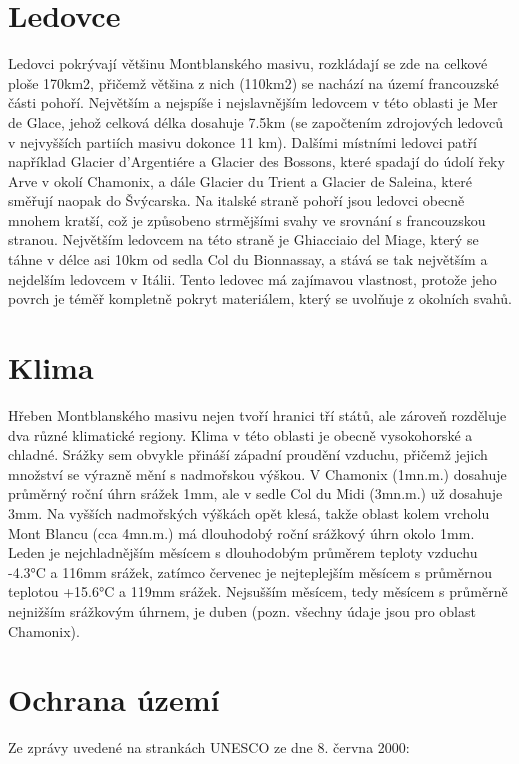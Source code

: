 \section{Ledovce}
Ledovci pokrývají většinu Montblanského masivu, rozkládají se zde na celkové ploše 170\:km2, přičemž většina z nich (110\:km2) se nachází na území francouzské části pohoří. Největším a nejspíše i nejslavnějším ledovcem v této oblasti je Mer de Glace, jehož celková délka dosahuje 7.5\:km (se započtením zdrojových ledovců v nejvyšších partiích masivu dokonce 11 km). Dalšími místními ledovci patří například Glacier d'Argentiére a Glacier des Bossons, které spadají do údolí řeky Arve v okolí Chamonix, a dále Glacier du Trient a Glacier de Saleina, které směřují naopak do Švýcarska. Na italské straně pohoří jsou ledovci obecně mnohem kratší, což je způsobeno strmějšími svahy ve srovnání s francouzskou stranou. Největším ledovcem na této straně je Ghiacciaio del Miage, který se táhne v délce asi 10\:km od sedla Col du Bionnassay, a stává se tak největším a nejdelším ledovcem v Itálii. Tento ledovec má zajímavou vlastnost, protože jeho povrch je téměř kompletně pokryt materiálem, který se uvolňuje z okolních svahů.

\section{Klima}
Hřeben Montblanského masivu nejen tvoří hranici tří států, ale zároveň rozděluje dva různé klimatické regiony. Klima v této oblasti je obecně vysokohorské a chladné. Srážky sem obvykle přináší západní proudění vzduchu, přičemž jejich množství se výrazně mění s nadmořskou výškou. V Chamonix (1\:m\:n.\:m.) dosahuje průměrný roční úhrn srážek 1\:mm, ale v sedle Col du Midi (3\:m\:n.\:m.) už dosahuje 3\:mm. Na vyšších nadmořských výškách opět klesá, takže oblast kolem vrcholu Mont Blancu (cca 4\:m\:n.\:m.) má dlouhodobý roční srážkový úhrn okolo 1\:mm. Leden je nejchladnějším měsícem s dlouhodobým průměrem teploty vzduchu -4.3\:°C a 116\:mm srážek, zatímco červenec je nejteplejším měsícem s průměrnou teplotou +15.6\:°C a 119\:mm srážek. Nejsušším měsícem, tedy měsícem s průměrně nejnižším srážkovým úhrnem, je duben (pozn. všechny údaje jsou pro oblast Chamonix).

\section{Ochrana území}
Ze zprávy uvedené na strankách UNESCO ze dne 8. června 2000: 

